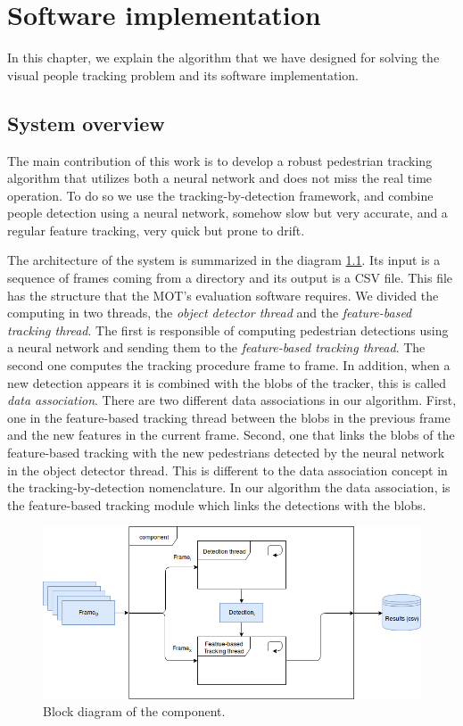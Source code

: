\chapter{Software implementation}\label{cap.software}

In this chapter, we explain the algorithm that we have designed for solving the visual people tracking problem and its software implementation. 

\section{System overview}

The main contribution of this work is to develop a robust pedestrian tracking algorithm that utilizes both a neural network and does not miss the real time operation. To do so we use the tracking-by-detection framework, and combine people detection using a neural network, somehow slow but very accurate, and a regular feature tracking, very quick but prone to drift. 

The architecture of the system is summarized in the diagram \ref{software1}. Its input is a sequence of frames coming from a directory and its output is a CSV file. This file has the structure that the MOT's evaluation software requires. We divided the computing in two threads, the \textit{object detector thread} and the \textit{feature-based tracking thread}. The first is responsible of computing pedestrian detections using a neural network and sending them to the \textit{feature-based tracking thread}. The second one computes the tracking procedure frame to frame. In addition, when a new detection appears it is combined with the blobs of the tracker, this is called \textit{data association}. There are two different data associations in our algorithm. First, one in the feature-based tracking thread between the blobs in the previous frame and the new features in the current frame. Second, one that links the blobs of the feature-based tracking with the new pedestrians detected by the neural network in the object detector thread. This is different to the data association concept in the tracking-by-detection nomenclature. In our algorithm the data association, is the feature-based tracking module which links the detections with the blobs.


\begin{figure}[H]
\centering         
\includegraphics[width=12cm]{flows/bloque2.png}
\caption{Block diagram of the component.} \label{software1}
\end{figure}



